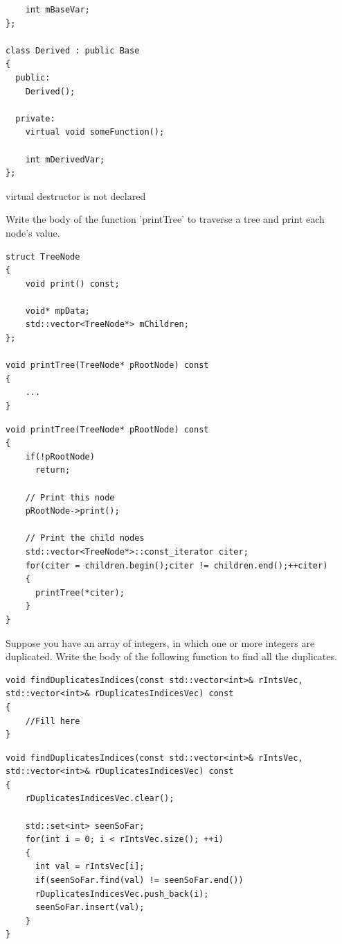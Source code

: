 \documentclass[answers]{exam}
\begin{document}
\begin{questions}
\begin{lstlisting}
    int mBaseVar;
};

class Derived : public Base
{
  public:
    Derived();

  private:
    virtual void someFunction();

    int mDerivedVar;
};
\end{lstlisting}
\begin{solution}[.2in]
virtual destructor is not declared
\end{solution}

\question Write the body of the function 'printTree' to traverse a tree and print each node’s value.
\begin{lstlisting}
struct TreeNode
{
    void print() const;

    void* mpData;
    std::vector<TreeNode*> mChildren;
};

void printTree(TreeNode* pRootNode) const
{
    ...
}
\end{lstlisting}
\begin{solution}[.2in]
\begin{lstlisting}
void printTree(TreeNode* pRootNode) const
{
    if(!pRootNode)
      return;

    // Print this node
    pRootNode->print();

    // Print the child nodes
    std::vector<TreeNode*>::const_iterator citer;
    for(citer = children.begin();citer != children.end();++citer)
    {
      printTree(*citer);
    }
}
\end{lstlisting}
\end{solution}

\question Suppose you have an array of integers, in which one or more integers are duplicated.
Write the body of the following function to find all the duplicates.
\begin{lstlisting}
void findDuplicatesIndices(const std::vector<int>& rIntsVec, 
std::vector<int>& rDuplicatesIndicesVec) const
{
    //Fill here
}
\end{lstlisting}
\begin{solution}[.2in]
\begin{lstlisting}
void findDuplicatesIndices(const std::vector<int>& rIntsVec,
std::vector<int>& rDuplicatesIndicesVec) const
{
    rDuplicatesIndicesVec.clear();

    std::set<int> seenSoFar;
    for(int i = 0; i < rIntsVec.size(); ++i)
    {
      int val = rIntsVec[i];
      if(seenSoFar.find(val) != seenSoFar.end())
      rDuplicatesIndicesVec.push_back(i);
      seenSoFar.insert(val);
    }
}
\end{lstlisting}
\end{solution}


\end{questions}
\end{document}
